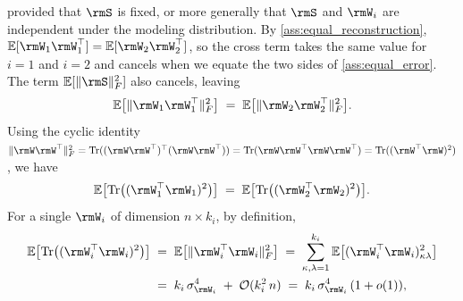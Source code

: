 \documentclass{article}
\begin{document}
provided that $\rmS$ is fixed, or more generally that $\rmS$ and $\rmW_i$ are independent under the modeling distribution. By \ref{ass:equal_reconstruction}, $\mathbb{E}[\rmW_1 \rmW_1^\top] = \mathbb{E}[\rmW_2 \rmW_2^\top]$, so the cross term takes the same value for $i = 1$ and $i = 2$ and cancels when we equate the two sides of \ref{ass:equal_error}. The term $\mathbb{E}[\|\rmS\|_F^2]$ also cancels, leaving
\begin{equation}
\mathbb{E}\bigl[\|\rmW_1 \rmW_1^\top\|_F^2\bigr]
\;=\; \mathbb{E}\bigl[\|\rmW_2 \rmW_2^\top\|_F^2\bigr].
\end{equation}
Using the cyclic identity
$\|\rmW \rmW^\top\|_F^2 = \mathrm{Tr}((\rmW \rmW^\top)^\top (\rmW \rmW^\top))
= \mathrm{Tr}(\rmW \rmW^\top \rmW \rmW^\top) = \mathrm{Tr}((\rmW^\top \rmW)^2)$, we have
\begin{equation}
\mathbb{E}\bigl[\mathrm{Tr}\bigl((\rmW_1^\top \rmW_1)^2\bigr)\bigr]
\;=\; \mathbb{E}\bigl[\mathrm{Tr}\bigl((\rmW_2^\top \rmW_2)^2\bigr)\bigr].
\label{eqt:sym_var_eq}
\end{equation}
For a single $\rmW_i$ of dimension $n \times k_i$, by definition,
\begin{align}
\mathbb{E}\bigl[\mathrm{Tr}\bigl((\rmW_i^\top \rmW_i)^2\bigr)\bigr]
&\;=\; \mathbb{E}\bigl[\|\rmW_i^\top \rmW_i\|_F^2\bigr]
\;=\; \sum_{\kappa, \lambda = 1}^{k_i} \mathbb{E}\bigl[(\rmW_i^\top \rmW_i)_{\kappa \lambda}^2\bigr] \\
&\;=\; k_i\, \sigma_{\rmW_i}^4 \;+\; \mathcal{O}(k_i^2\, n)
\;=\; k_i\, \sigma_{\rmW_i}^4\,(1 + o(1)),
\end{align}
\end{document}
